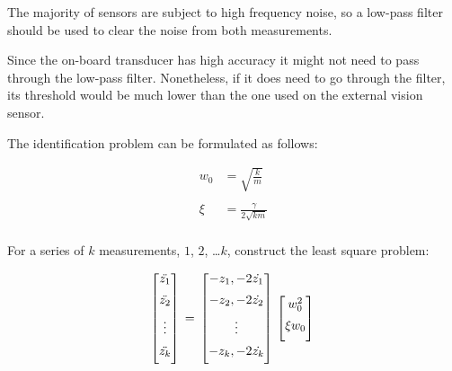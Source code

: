 The majority of sensors are subject to high frequency noise, so a low-pass filter should be used to clear the noise from both measurements.

Since the on-board transducer has high accuracy it might not need to pass through the low-pass filter. Nonetheless, if it does need to go through the filter, its threshold would be much lower than the one used on the external vision sensor.

\bigskip

The identification problem can be formulated as follows:

\begin{align*}
    w_0 &= \sqrt{\frac{k}{m}} \\
    \\
    \xi &= \frac{\gamma}{2\sqrt{km}} \\
\end{align*}

\clearpage

For a series of $k$ measurements, $1$, $2$, \dots $k$, construct the least square problem:

\begin{equation*}
    \begin{bmatrix}
        \ddot{z_1} \\[0.5em]
        \ddot{z_2} \\[0.5em]
        \vdots     \\[0.5em]
        \ddot{z_k} \\[0.5em]
    \end{bmatrix} \\
    = \\
    \begin{bmatrix}
        - z_1, - 2 \dot{z_1} \\[0.5em]
        - z_2, - 2 \dot{z_2} \\[0.5em]
        \vdots               \\[0.5em]
        - z_k, - 2 \dot{z_k} \\[0.5em]
    \end{bmatrix} \\
    \begin{bmatrix}
        w^2_0 \\[0.5em]
        \xi w_0 \\[0.5em]
    \end{bmatrix}  \\
\end{equation*}

\newpage
